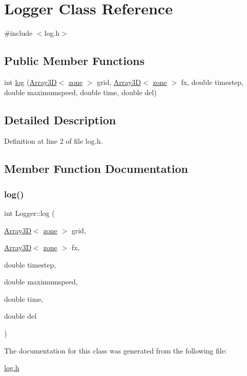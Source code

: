 \hypertarget{classLogger}{}\section{Logger Class Reference}
\label{classLogger}


{\ttfamily \#include $<$log.\+h$>$}

\subsection*{Public Member Functions}
\begin{DoxyCompactItemize}
\item 
int \hyperlink{classLogger_a1c65992d1a4de5f018a0c864a83ed960}{log} (\hyperlink{classTNT_1_1Array3D}{Array3D}$<$ \hyperlink{structzone}{zone} $>$ grid, \hyperlink{classTNT_1_1Array3D}{Array3D}$<$ \hyperlink{structzone}{zone} $>$ fx, double timestep, double maximumspeed, double time, double del)
\end{DoxyCompactItemize}


\subsection{Detailed Description}


Definition at line 2 of file log.\+h.



\subsection{Member Function Documentation}
\mbox{\label{classLogger_a1c65992d1a4de5f018a0c864a83ed960}} 
\subsubsection{\texorpdfstring{log()}{log()}}
{\footnotesize\ttfamily int Logger\+::log (\begin{DoxyParamCaption}\item[{\hyperlink{classTNT_1_1Array3D}{Array3D}$<$ \hyperlink{structzone}{zone} $>$}]{grid,  }\item[{\hyperlink{classTNT_1_1Array3D}{Array3D}$<$ \hyperlink{structzone}{zone} $>$}]{fx,  }\item[{double}]{timestep,  }\item[{double}]{maximumspeed,  }\item[{double}]{time,  }\item[{double}]{del }\end{DoxyParamCaption})}



The documentation for this class was generated from the following file\+:\begin{DoxyCompactItemize}
\item 
\hyperlink{log_8h}{log.\+h}\end{DoxyCompactItemize}
